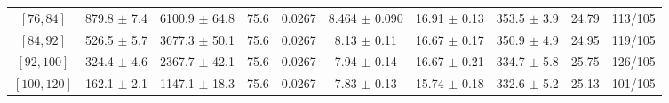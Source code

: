 \begin{tabular}{c||c|c|c|c|c|c|c||c|c}
$[76, 84]$ & 879.8 $\pm$ 7.4 & 6100.9 $\pm$ 64.8 & 75.6 & 0.0267 & 8.464 $\pm$ 0.090 & 16.91 $\pm$ 0.13 & 353.5 $\pm$ 3.9 & 24.79 & 113/105\\
$[84, 92]$ & 526.5 $\pm$ 5.7 & 3677.3 $\pm$ 50.1 & 75.6 & 0.0267 & 8.13 $\pm$ 0.11 & 16.67 $\pm$ 0.17 & 350.9 $\pm$ 4.9 & 24.95 & 119/105\\
$[92, 100]$ & 324.4 $\pm$ 4.6 & 2367.7 $\pm$ 42.1 & 75.6 & 0.0267 & 7.94 $\pm$ 0.14 & 16.67 $\pm$ 0.21 & 334.7 $\pm$ 5.8 & 25.75 & 126/105\\
$[100, 120]$ & 162.1 $\pm$ 2.1 & 1147.1 $\pm$ 18.3 & 75.6 & 0.0267 & 7.83 $\pm$ 0.13 & 15.74 $\pm$ 0.18 & 332.6 $\pm$ 5.2 & 25.13 & 101/105\\
\end{tabular}
